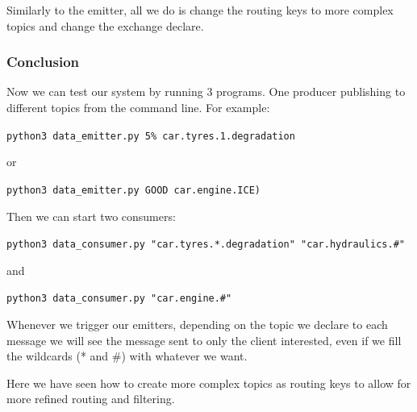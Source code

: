 \documentclass{article}
\begin{document}
Similarly to the emitter, all we do is change the routing keys to more complex topics and change the exchange declare.

\subsubsection{Conclusion}

Now we can test our system by running 3 programs. One producer publishing to different topics from the command line. For example: 

\verb|python3 data_emitter.py 5% car.tyres.1.degradation|

or 

\verb|python3 data_emitter.py GOOD car.engine.ICE)|

Then we can start two consumers:

\verb|python3 data_consumer.py "car.tyres.*.degradation" "car.hydraulics.#"|

and

\verb|python3 data_consumer.py "car.engine.#"|

Whenever we trigger our emitters, depending on the topic we declare to each message we will see the message sent to only the client interested, even if we fill the wildcards (* and \#) with whatever we want.

Here we have seen how to create more complex topics as routing keys to allow for more refined routing and filtering.
\end{document}
